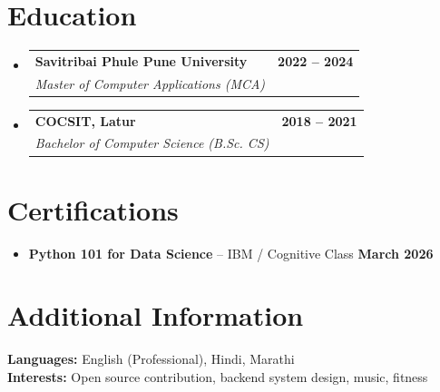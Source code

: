 \documentclass[letterpaper,11pt]{article}
\makeatletter
\newcommand{\resumeItem}[1]{\item\small{{#1 \vspace{-2pt}}}}
\newcommand{\resumeSubheading}[4]{
  \vspace{-2pt}\item
    \begin{tabular*}{1.0\textwidth}[t]{l@{\extracolsep{\fill}}r}
      \textbf{#1} & \textbf{\small #2} \\
      \textit{\small#3} & \textit{\small #4} \\
    \end{tabular*}\vspace{-6pt}
}
\newcommand{\resumeItemListStart}{\begin{itemize}}
\newcommand{\resumeItemListEnd}{\end{itemize}\vspace{-5pt}}
\newcommand{\resumeSubHeadingListStart}{\begin{itemize}[leftmargin=0.0in, label={}]}
\newcommand{\resumeSubHeadingListEnd}{\end{itemize}}
\makeatother
\begin{document}
\section{Education}
\resumeSubHeadingListStart

\resumeSubheading
{Savitribai Phule Pune University}{2022 -- 2024}
{Master of Computer Applications (MCA)}{}

\resumeSubheading
{COCSIT, Latur}{2018 -- 2021}
{Bachelor of Computer Science (B.Sc. CS)}{}

\resumeSubHeadingListEnd

\section{Certifications}
\resumeItemListStart
\resumeItem{\textbf{Python 101 for Data Science} -- IBM / Cognitive Class \hfill \textbf{March 2026}}
\resumeItemListEnd

\section{Additional Information}
\textbf{Languages:} English (Professional), Hindi, Marathi \\[3pt]
\textbf{Interests:} Open source contribution, backend system design, music, fitness
\end{document}
